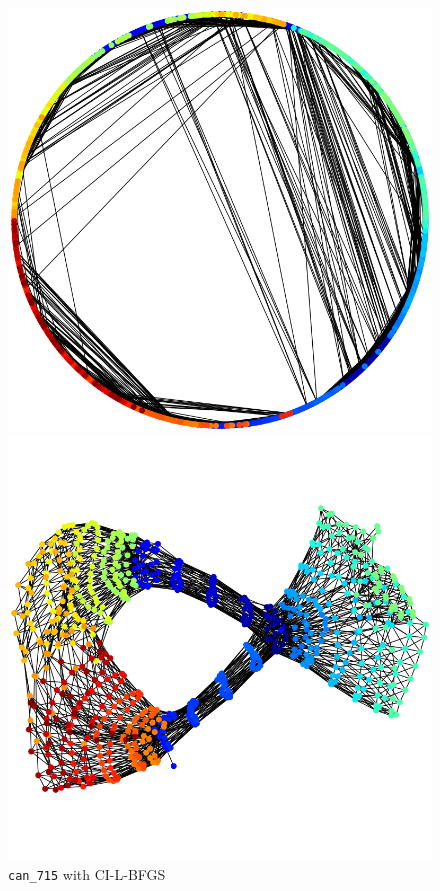 \documentclass[dvipdfmx,10pt,journal,compsoc]{IEEEtran}
\begin{document}
\begin{figure}[t]
  \centering
  \begin{minipage}{0.49\columnwidth}
    \centering
    \includegraphics[width=\columnwidth]{circle/vis/can_715_CI-L-BFGS_50_first.png}
  \end{minipage}
  \begin{minipage}{0.49\columnwidth}
    \centering
    \includegraphics[width=\columnwidth]{circle/vis/can_715_CI-L-BFGS_50_last.png}
  \end{minipage}
  \caption{\texttt{can\_715} with \textsf{CI-L-BFGS}}
  \label{fig:can_715_CI}
\end{figure}
\end{document}
